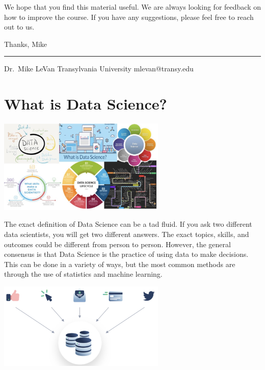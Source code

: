 \documentclass[
  letterpaper,
  DIV=11,
  numbers=noendperiod]{scrreprt}
\begin{document}
We hope that you find this material useful. We are always looking for
feedback on how to improve the course. If you have any suggestions,
please feel free to reach out to us.

Thanks, Mike

\begin{center}\rule{0.5\linewidth}{0.5pt}\end{center}

Dr.~Mike LeVan Transylvania University mlevan@transy.edu


\chapter*{What is Data Science?}\label{what-is-data-science}


\includegraphics[width=0.6\textwidth,height=\textheight]{./images/WIDS-1.jpg}

The exact definition of Data Science can be a tad fluid. If you ask two
different data scientists, you will get two different answers. The exact
topics, skills, and outcomes could be different from person to person.
However, the general consensus is that Data Science is the practice of
using data to make decisions. This can be done in a variety of ways, but
the most common methods are through the use of statistics and machine
learning.

\includegraphics[width=0.6\textwidth,height=\textheight]{./images/WIDS-2.jpg}
\end{document}

